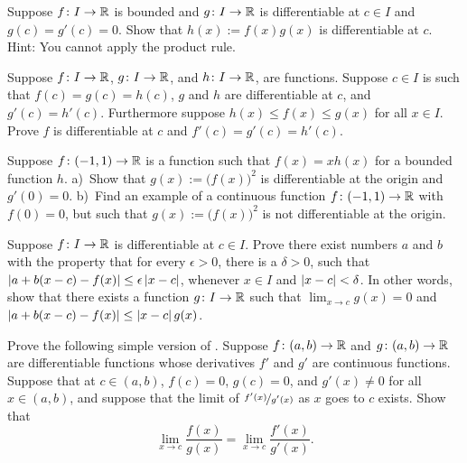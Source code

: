\begin{exercise} \label{exercise:bndmuldiff}
Suppose $f \colon I \to {\mathbb{R}}$ is bounded and $g \colon I \to
{\mathbb{R}}$ is differentiable at $c \in I$ and $g(c) = g'(c) = 0$.  Show
that $h(x) := f(x) g(x)$ is differentiable at $c$.  Hint: You
cannot apply the product rule.
\end{exercise}

\begin{exercise} \label{exercise:diffsqueeze}
Suppose $f \colon I \to {\mathbb{R}}$, 
$g \colon I \to {\mathbb{R}}$, and
$h \colon I \to {\mathbb{R}}$, are functions.  Suppose $c \in I$ is such that
$f(c) = g(c) = h(c)$, $g$ and $h$ are differentiable at $c$,
and $g'(c) = h'(c)$.  Furthermore suppose $h(x) \leq f(x) \leq g(x)$ for
all $x \in I$.  Prove $f$ is differentiable at $c$ and $f'(c) = g'(c) =
h'(c)$.
\end{exercise}

\begin{exercise}
Suppose $f \colon (-1,1) \to {\mathbb{R}}$ is a function such that $f(x) = x h(x)$ for a bounded
function $h$.  a)~Show that $g(x) := {\bigl( f(x) \bigr)}^2$ is
differentiable at the origin and $g'(0) = 0$.  b)~Find an example of a
continuous function $f \colon (-1,1) \to {\mathbb{R}}$ with $f(0) = 0$, but such
that $g(x) := {\bigl( f(x) \bigr)}^2$ is not differentiable at the origin.
\end{exercise}

\begin{exercise}
Suppose $f \colon I \to {\mathbb{R}}$ is differentiable at $c \in I$.
Prove there exist numbers $a$ and $b$ with the property that
for every $\epsilon > 0$, there is a $\delta > 0$, such that
$\left\lvert {a+b(x-c) - f(x)} \right\rvert \leq \epsilon \left\lvert {x-c} \right\rvert$, whenever $x \in I$ and
$\left\lvert {x-c} \right\rvert < \delta$.
In other words, show that
there exists a function $g \colon I \to {\mathbb{R}}$
such that $\lim_{x\to c} g(x) = 0$ and
$\left\lvert {a+b(x-c) - f(x)} \right\rvert \leq \left\lvert {x-c} \right\rvert g(x)$.
\end{exercise}

\begin{exercise} \label{exercise:simpleLHopital}
Prove the following simple version of .  Suppose 
$f \colon (a,b) \to {\mathbb{R}}$ and $g \colon (a,b) \to {\mathbb{R}}$ are differentiable
functions
whose derivatives $f'$ and $g'$ are continuous functions.
Suppose that at $c \in (a,b)$, $f(c) = 0$, $g(c)=0$,
and
$g'(x) \not= 0$ for all $x \in (a,b)$, and suppose
that the limit of $\nicefrac{f'(x)}{g'(x)}$ as $x$ goes to $c$ exists.  Show that
\begin{equation*}
\lim_{x \to c} \frac{f(x)}{g(x)} = 
\lim_{x \to c} \frac{f'(x)}{g'(x)} .
\end{equation*}
\end{exercise}

